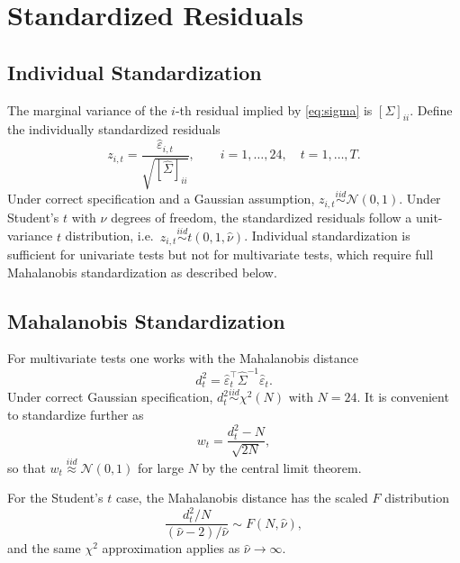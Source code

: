 \documentclass[12pt]{article}
\begin{document}
\section{Standardized Residuals}

\subsection{Individual Standardization}

The marginal variance of the $i$-th residual implied by \eqref{eq:sigma} is
$[\Sigma]_{ii}$. Define the individually standardized residuals
\begin{equation}
    z_{i,t} = \frac{\hat{\varepsilon}_{i,t}}{\sqrt{[\hat{\Sigma}]_{ii}}},
    \qquad i = 1,\ldots,24,\quad t = 1,\ldots,T.
    \label{eq:zit}
\end{equation}
Under correct specification and a Gaussian assumption, $z_{i,t} \overset{iid}{\sim} \mathcal{N}(0,1)$.
Under Student's $t$ with $\nu$ degrees of freedom, the standardized residuals follow a
unit-variance $t$ distribution, i.e.\ $z_{i,t} \overset{iid}{\sim} t\!\left(0, 1, \hat{\nu}\right)$.
Individual standardization is sufficient for univariate tests but not for multivariate
tests, which require full Mahalanobis standardization as described below.

\subsection{Mahalanobis Standardization}

For multivariate tests one works with the Mahalanobis distance
\begin{equation}
    d_t^2 = \hat{\varepsilon}_t^\top \hat{\Sigma}^{-1} \hat{\varepsilon}_t.
    \label{eq:mahal}
\end{equation}
Under correct Gaussian specification, $d_t^2 \overset{iid}{\sim} \chi^2(N)$ with $N = 24$.
It is convenient to standardize further as
\begin{equation}
    w_t = \frac{d_t^2 - N}{\sqrt{2N}},
\end{equation}
so that $w_t \overset{iid}{\approx} \mathcal{N}(0,1)$ for large $N$ by the central limit theorem.

For the Student's $t$ case, the Mahalanobis distance has the scaled $F$ distribution
\begin{equation}
    \frac{d_t^2 / N}{(\hat{\nu} - 2)/\hat{\nu}} \sim F(N, \hat{\nu}),
\end{equation}
and the same $\chi^2$ approximation applies as $\hat{\nu} \to \infty$.
\end{document}
